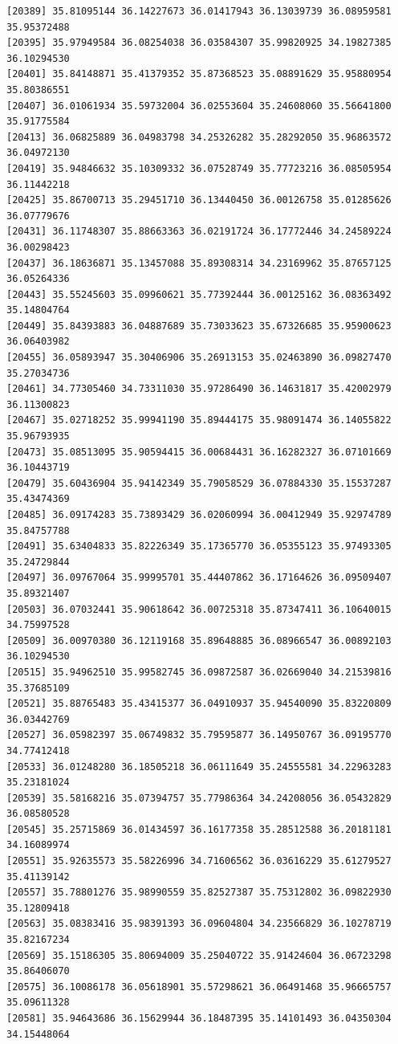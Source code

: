 \documentclass[
  letterpaper,
  DIV=11,
  numbers=noendperiod]{scrartcl}
\begin{document}
\begin{verbatim}
[20389] 35.81095144 36.14227673 36.01417943 36.13039739 36.08959581 35.95372488
[20395] 35.97949584 36.08254038 36.03584307 35.99820925 34.19827385 36.10294530
[20401] 35.84148871 35.41379352 35.87368523 35.08891629 35.95880954 35.80386551
[20407] 36.01061934 35.59732004 36.02553604 35.24608060 35.56641800 35.91775584
[20413] 36.06825889 36.04983798 34.25326282 35.28292050 35.96863572 36.04972130
[20419] 35.94846632 35.10309332 36.07528749 35.77723216 36.08505954 36.11442218
[20425] 35.86700713 35.29451710 36.13440450 36.00126758 35.01285626 36.07779676
[20431] 36.11748307 35.88663363 36.02191724 36.17772446 34.24589224 36.00298423
[20437] 36.18636871 35.13457088 35.89308314 34.23169962 35.87657125 36.05264336
[20443] 35.55245603 35.09960621 35.77392444 36.00125162 36.08363492 35.14804764
[20449] 35.84393883 36.04887689 35.73033623 35.67326685 35.95900623 36.06403982
[20455] 36.05893947 35.30406906 35.26913153 35.02463890 36.09827470 35.27034736
[20461] 34.77305460 34.73311030 35.97286490 36.14631817 35.42002979 36.11300823
[20467] 35.02718252 35.99941190 35.89444175 35.98091474 36.14055822 35.96793935
[20473] 35.08513095 35.90594415 36.00684431 36.16282327 36.07101669 36.10443719
[20479] 35.60436904 35.94142349 35.79058529 36.07884330 35.15537287 35.43474369
[20485] 36.09174283 35.73893429 36.02060994 36.00412949 35.92974789 35.84757788
[20491] 35.63404833 35.82226349 35.17365770 36.05355123 35.97493305 35.24729844
[20497] 36.09767064 35.99995701 35.44407862 36.17164626 36.09509407 35.89321407
[20503] 36.07032441 35.90618642 36.00725318 35.87347411 36.10640015 34.75997528
[20509] 36.00970380 36.12119168 35.89648885 36.08966547 36.00892103 36.10294530
[20515] 35.94962510 35.99582745 36.09872587 36.02669040 34.21539816 35.37685109
[20521] 35.88765483 35.43415377 36.04910937 35.94540090 35.83220809 36.03442769
[20527] 36.05982397 35.06749832 35.79595877 36.14950767 36.09195770 34.77412418
[20533] 36.01248280 36.18505218 36.06111649 35.24555581 34.22963283 35.23181024
[20539] 35.58168216 35.07394757 35.77986364 34.24208056 36.05432829 36.08580528
[20545] 35.25715869 36.01434597 36.16177358 35.28512588 36.20181181 34.16089974
[20551] 35.92635573 35.58226996 34.71606562 36.03616229 35.61279527 35.41139142
[20557] 35.78801276 35.98990559 35.82527387 35.75312802 36.09822930 35.12809418
[20563] 35.08383416 35.98391393 36.09604804 34.23566829 36.10278719 35.82167234
[20569] 35.15186305 35.80694009 35.25040722 35.91424604 36.06723298 35.86406070
[20575] 36.10086178 36.05618901 35.57298621 36.06491468 35.96665757 35.09611328
[20581] 35.94643686 36.15629944 36.18487395 35.14101493 36.04350304 34.15448064

\end{verbatim}
\end{document}
